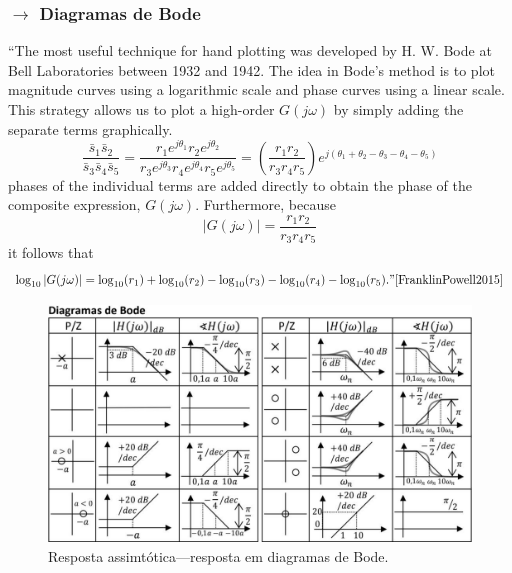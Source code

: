 \subsubsection[1.2.4 Diagramas de Bode]{$\pmb{\rightarrow}$ Diagramas de Bode}

``The most useful technique for hand plotting was developed by H. W. Bode at Bell Laboratories between 1932 and 1942. The idea in Bode's method is to plot magnitude curves using a logarithmic scale and phase curves using a linear scale. This strategy allows us to plot a high-order $G(j\omega)$ by simply adding the separate terms graphically.
$$
    \frac{\bar{s}_1 \bar{s}_2}{\bar{s}_3 \bar{s}_4 \bar{s}_5} = \frac{r_1 e^{j\theta_1} r_2 e^{j\theta_2}}{r_3 e^{j\theta_3} r_4 e^{j\theta_4} r_5 e^{j\theta_5}} =
    \left( \frac{r_1 r_2}{r_3 r_4 r_5} \right) e^{j(\theta_1 + \theta_2 - \theta_3 - \theta_4 - \theta_5)}
$$
phases of the individual terms are added directly to obtain the phase of the composite expression, $G(j\omega)$. Furthermore, because
$$
    \vert G(j\omega) \vert = \frac{r_1 r_2}{r_3 r_4 r_5}
$$
it follows that
$$
    \log_{10}\vert G(j\omega) \vert = \log_{10}(r_1) + \log_{10}(r_2) - \log_{10}(r_3) - \log_{10}(r_4) - \log_{10}(r_5).\text{''\cite{FranklinPowell2015}}
$$

\begin{figure}[H]
    \centering
    \includegraphics[width = 0.7\linewidth]{img/state-space-models/bode.png}
    \caption{Resposta assimtótica---resposta em diagramas de Bode.}
    \label{fig:bode}
\end{figure}

